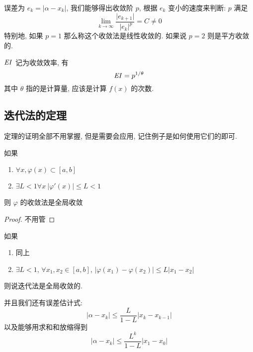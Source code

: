 \begin{frame}
		\begin{defi}[收敛速度]
		误差为 \(e _{k} =\vert \alpha - x_{k}\vert\), 我们能够得出收敛阶 \(p\), 根据 \(e _{k}\) 变小的速度来判断: \(p\) 满足
				\[
						\lim_{k\to \infty} \frac{\vert e_{k+1} \vert}{\ \vert e_{k} \vert ^{p}} = C \ne 0
				\]
		特别地, 如果 \(p = 1\) 那么称这个收敛法是线性收敛的. 如果说 \(p = 2\) 则是平方收敛的.
		\end{defi}
\begin{defi}[收敛效率]
		\(\it EI\) 记为收敛效率, 有
		\[
				{\it EI} = p ^{1/ \theta}
		\]
		其中 \(\theta\) 指的是计算量, 应该是计算 \(f (x)\) 的次数.
\end{defi}
\end{frame}

\subsection{迭代法的定理}
\begin{frame}
定理的证明全部不用掌握, 但是需要会应用, 记住例子是如何使用它们的即可.

\begin{thm}
		如果
		\begin{enumerate}
				\item \(\forall x, \varphi (x) \subset [a ,b ]\)
				\item \(\exists L < 1\forall x\ \vert \varphi ' (x) \vert \le L < 1\)
		\end{enumerate}
		则 \( \varphi\) 的收敛法是全局收敛
\end{thm}
\begin{proof}
不用管
\end{proof}
\end{frame}

\begin{frame}
	\begin{thm}
		如果
		\begin{enumerate}
			\item 同上
			\item \(\exists L < 1\), \(\forall x _{1} , x_{2} \in [a , b]\), \( \vert \varphi (x_{1}) - \varphi(x_{2}) \vert \le L \vert x_{1} - x_{2} \vert\)
		\end{enumerate}
		则说迭代法是全局收敛的.
	\end{thm}
	并且我们还有误差估计式:
	\[
		\vert\alpha - x_{k}\vert \le \frac{L}{1 - L} \vert x_{k} - x_{k-1} \vert
	\]
	以及能够用求和和放缩得到
	\[
		\vert \alpha - x_{k} \vert \le \frac{L ^{k}}{1 - L} \vert x _{1} - x_{0} \vert
	\]
\end{frame}

